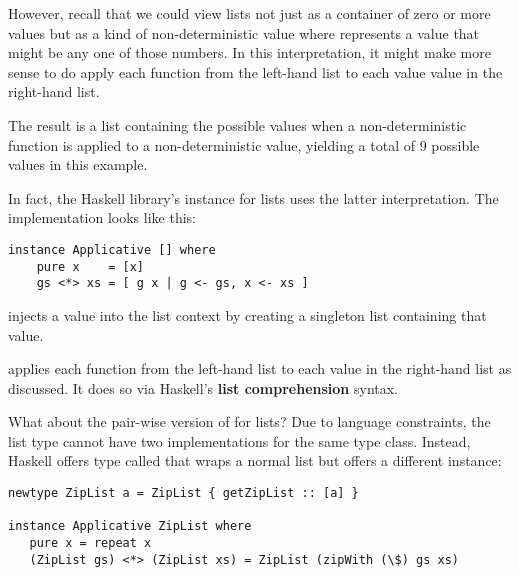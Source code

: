 However, recall that we could view lists not just as a container of zero or more values but as a kind of non-deterministic value
where \code{[4, 5, 6]} represents a value that might be any one of those numbers. In this interpretation, it might make more
sense to do apply each function from the left-hand list to each value value in the right-hand list.

The result is a list containing the possible values when a non-deterministic function is applied to a non-deterministic
value, yielding a total of 9 possible values in this example.

In fact, the Haskell library's  instance for lists uses the latter interpretation. The implementation looks like this:

\begin{lstlisting}
instance Applicative [] where
    pure x    = [x]
    gs <*> xs = [ g x | g <- gs, x <- xs ]
\end{lstlisting}

\begin{notelist}
    \item {} injects a value into the list context by creating a singleton list containing that value.
    \item \code{(<*>)} applies each function from the left-hand list to each value in the right-hand list as discussed. It does
          so via Haskell's \textbf{list comprehension} syntax.
\end{notelist}

What about the pair-wise version of  for lists? Due to language constraints, the list type cannot have
two implementations for the same type class. Instead, Haskell offers type called  that wraps a normal
list but offers a different  instance:

\begin{lstlisting}
newtype ZipList a = ZipList { getZipList :: [a] }
 
instance Applicative ZipList where
   pure x = repeat x
   (ZipList gs) <*> (ZipList xs) = ZipList (zipWith (\$) gs xs)
\end{lstlisting}

